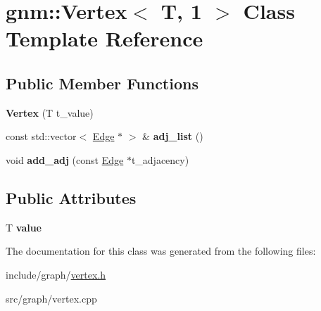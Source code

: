 \hypertarget{classgnm_1_1_vertex_3_01_t_00_011_01_4}{}\section{gnm\+:\+:Vertex$<$ T, 1 $>$ Class Template Reference}
\label{classgnm_1_1_vertex_3_01_t_00_011_01_4}
\subsection*{Public Member Functions}
\begin{DoxyCompactItemize}
\item 
{\bfseries Vertex} (T t\+\_\+value)\hypertarget{classgnm_1_1_vertex_3_01_t_00_011_01_4_a13bb675f42465cd506a9fceaabc7d55d}{}\label{classgnm_1_1_vertex_3_01_t_00_011_01_4_a13bb675f42465cd506a9fceaabc7d55d}

\item 
const std\+::vector$<$ \hyperlink{classgnm_1_1_edge}{Edge} $\ast$ $>$ \& {\bfseries adj\+\_\+list} ()\hypertarget{classgnm_1_1_vertex_3_01_t_00_011_01_4_a09ecfb3fbd965fe2402d8599c8b903f1}{}\label{classgnm_1_1_vertex_3_01_t_00_011_01_4_a09ecfb3fbd965fe2402d8599c8b903f1}

\item 
void {\bfseries add\+\_\+adj} (const \hyperlink{classgnm_1_1_edge}{Edge} $\ast$t\+\_\+adjacency)\hypertarget{classgnm_1_1_vertex_3_01_t_00_011_01_4_a8c15168e5fe9a86094687a431e499f4e}{}\label{classgnm_1_1_vertex_3_01_t_00_011_01_4_a8c15168e5fe9a86094687a431e499f4e}

\end{DoxyCompactItemize}
\subsection*{Public Attributes}
\begin{DoxyCompactItemize}
\item 
T {\bfseries value}\hypertarget{classgnm_1_1_vertex_3_01_t_00_011_01_4_a0f3090bff934258ec91bb5699cf8be38}{}\label{classgnm_1_1_vertex_3_01_t_00_011_01_4_a0f3090bff934258ec91bb5699cf8be38}

\end{DoxyCompactItemize}


The documentation for this class was generated from the following files\+:\begin{DoxyCompactItemize}
\item 
include/graph/\hyperlink{vertex_8h}{vertex.\+h}\item 
src/graph/vertex.\+cpp\end{DoxyCompactItemize}
